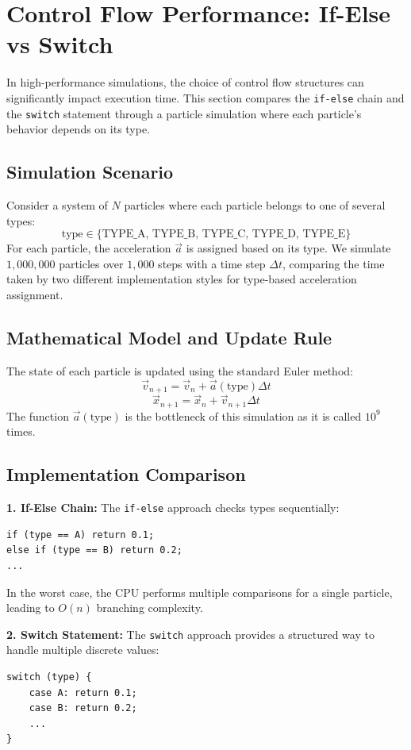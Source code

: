 \section*{Control Flow Performance: If-Else vs Switch}

In high-performance simulations, the choice of control flow structures can significantly impact execution time. This section compares the \texttt{if-else} chain and the \texttt{switch} statement through a particle simulation where each particle's behavior depends on its type.

\subsection*{Simulation Scenario}

Consider a system of $N$ particles where each particle belongs to one of several types:
\[
\text{type} \in \{\text{TYPE\_A, TYPE\_B, TYPE\_C, TYPE\_D, TYPE\_E}\}
\]
For each particle, the acceleration $\vec{a}$ is assigned based on its type. We simulate $1,000,000$ particles over $1,000$ steps with a time step $\Delta t$, comparing the time taken by two different implementation styles for type-based acceleration assignment.

\subsection*{Mathematical Model and Update Rule}

The state of each particle is updated using the standard Euler method:
\[
\vec{v}_{n+1} = \vec{v}_n + \vec{a}(\text{type}) \Delta t
\]
\[
\vec{x}_{n+1} = \vec{x}_n + \vec{v}_{n+1} \Delta t
\]
The function $\vec{a}(\text{type})$ is the bottleneck of this simulation as it is called $10^9$ times.

\subsection*{Implementation Comparison}

\textbf{1. If-Else Chain:}
The \texttt{if-else} approach checks types sequentially:
\begin{verbatim}
if (type == A) return 0.1;
else if (type == B) return 0.2;
...
\end{verbatim}
In the worst case, the CPU performs multiple comparisons for a single particle, leading to $O(n)$ branching complexity.

\textbf{2. Switch Statement:}
The \texttt{switch} approach provides a structured way to handle multiple discrete values:
\begin{verbatim}
switch (type) {
    case A: return 0.1;
    case B: return 0.2;
    ...
}
\end{verbatim}

